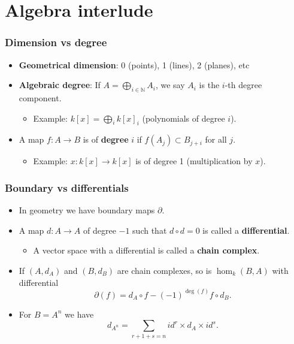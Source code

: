 \documentclass{beamer}
\theoremstyle{definition}
\begin{document}
\section{Algebra interlude}
\begin{frame}
\frametitle{Dimension vs degree}

\begin{itemize}
\item<1-> \textbf{Geometrical dimension}: 0 (points), 1 (lines), 2 (planes), etc
\item<2-> \textbf{Algebraic degree}: If $A=\bigoplus_{i\in\mathbb{N}} A_i$, we say $A_i$ is the $i$-th degree component.
\begin{itemize}
\item<3-> Example: $k[x]=\bigoplus_i k[x]_i$ (polynomials of degree $i$).
\end{itemize}
\item<4-> A map $f:A\to B$ is of \textbf{degree} $i$ if $f(A_j)\subset B_{j+i}$ for all $j$.
\begin{itemize}
\item<5-> Example: $x:k[x]\to k[x]$ is of degree 1 (multiplication by $x$).
\end{itemize}

\end{itemize}
\end{frame}
\begin{frame}
\frametitle{Boundary vs differentials}
\begin{itemize}
\item In geometry we have boundary maps $\partial$.

\item<2-> A map $d:A\to A$ of degree $-1$ such that $d\circ d=0$ is called a \textbf{differential}. %
\begin{itemize}
\item<3-> A vector space with a differential is called a \textbf{chain complex}.
\end{itemize}
\item<4-> If $(A,d_A)$ and $(B,d_B)$ are chain complexes, so is $\hom_k(B,A)$ with differential
\[\partial(f)=d_A\circ f - (-1)^{\deg(f)}f\circ d_B.\] 
\item<5-> For $B=A^n$ we have 
\[d_{A^n}= \sum_{r+1+s=n} id^r\times d_A\times id^s.\]
\end{itemize}
\end{frame}
\end{document}
